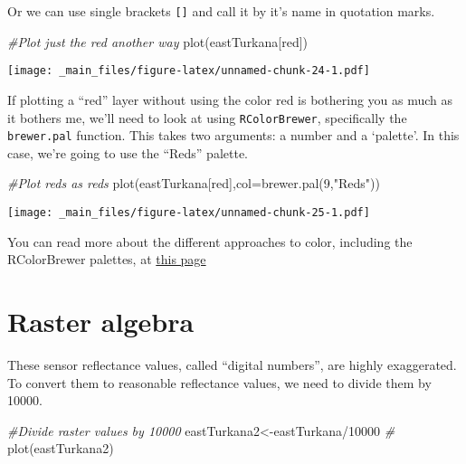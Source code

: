 \documentclass[
]{book}
\newenvironment{Shaded}{\begin{snugshade}}{\end{snugshade}}
\newcommand{\AttributeTok}[1]{\textcolor[rgb]{0.77,0.63,0.00}{#1}}
\newcommand{\CommentTok}[1]{\textcolor[rgb]{0.56,0.35,0.01}{\textit{#1}}}
\newcommand{\DecValTok}[1]{\textcolor[rgb]{0.00,0.00,0.81}{#1}}
\newcommand{\FunctionTok}[1]{\textcolor[rgb]{0.00,0.00,0.00}{#1}}
\newcommand{\NormalTok}[1]{#1}
\newcommand{\OtherTok}[1]{\textcolor[rgb]{0.56,0.35,0.01}{#1}}
\newcommand{\SpecialCharTok}[1]{\textcolor[rgb]{0.00,0.00,0.00}{#1}}
\newcommand{\StringTok}[1]{\textcolor[rgb]{0.31,0.60,0.02}{#1}}
\begin{document}
Or we can use single brackets \texttt{{[}{]}} and call it by it's name in quotation marks.

\begin{Shaded}
\begin{Highlighting}[]
\CommentTok{\#Plot just the red another way}
\FunctionTok{plot}\NormalTok{(eastTurkana[}\StringTok{\textquotesingle{}red\textquotesingle{}}\NormalTok{])}
\end{Highlighting}
\end{Shaded}

\texttt{[image: \_main\_files/figure-latex/unnamed-chunk-24-1.pdf]}

If plotting a ``red'' layer without using the color red is bothering you as much as it bothers me, we'll need to look at using \texttt{RColorBrewer}, specifically the \texttt{brewer.pal} function. This takes two arguments: a number and a `palette'. In this case, we're going to use the ``Reds'' palette.

\begin{Shaded}
\begin{Highlighting}[]
\CommentTok{\#Plot reds as reds}
\FunctionTok{plot}\NormalTok{(eastTurkana[}\StringTok{\textquotesingle{}red\textquotesingle{}}\NormalTok{],}\AttributeTok{col=}\FunctionTok{brewer.pal}\NormalTok{(}\DecValTok{9}\NormalTok{,}\StringTok{"Reds"}\NormalTok{))}
\end{Highlighting}
\end{Shaded}

\texttt{[image: \_main\_files/figure-latex/unnamed-chunk-25-1.pdf]}

You can read more about the different approaches to color, including the RColorBrewer palettes, at \href{https://bootstrappers.umassmed.edu/bootstrappers-courses/pastCourses/rCourse_2016-04/Additional_Resources/Rcolorstyle.html}{this page}

\hypertarget{raster-algebra}{%
\section{Raster algebra}\label{raster-algebra}}

These sensor reflectance values, called ``digital numbers'', are highly exaggerated. To convert them to reasonable reflectance values, we need to divide them by 10000.

\begin{Shaded}
\begin{Highlighting}[]
\CommentTok{\#Divide raster values by 10000}
\NormalTok{eastTurkana2}\OtherTok{\textless{}{-}}\NormalTok{eastTurkana}\SpecialCharTok{/}\DecValTok{10000}
\CommentTok{\#}
\FunctionTok{plot}\NormalTok{(eastTurkana2)}
\end{Highlighting}
\end{Shaded}
\end{document}
